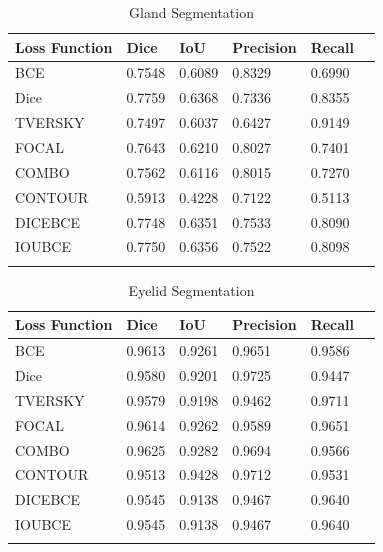 \documentclass{article}
\begin{document}




\begin{table}[h]
\centering
\caption{Gland Segmentation}
\begin{tabular}{llllll}
   Loss Function & Dice  & IoU & Precision & Recall \\
   \hline
   BCE & 0.7548& 0.6089& 0.8329& 0.6990\\
   Dice & 0.7759& 0.6368& 0.7336& 0.8355\\
   TVERSKY & 0.7497& 0.6037& 0.6427& 0.9149\\
   FOCAL & 0.7643& 0.6210& 0.8027& 0.7401\\
   COMBO&0.7562&0.6116&0.8015&0.7270\\
   CONTOUR&0.5913&0.4228&0.7122&0.5113\\
   DICEBCE&0.7748&0.6351&0.7533&0.8090\\
   IOUBCE&0.7750&0.6356&0.7522&0.8098\\
\label{tab:gland-eval-metrics}
\end{tabular}
\end{table}


\begin{table}[h]
\centering
\caption{Eyelid Segmentation}
\begin{tabular}{llllll}
   Loss Function & Dice  & IoU & Precision & Recall \\
   \hline
   BCE & 0.9613& 0.9261& 0.9651& 0.9586\\
   Dice & 0.9580& 0.9201& 0.9725& 0.9447\\
   TVERSKY & 0.9579& 0.9198& 0.9462& 0.9711\\
   FOCAL & 0.9614& 0.9262& 0.9589& 0.9651\\
   COMBO&0.9625&0.9282&0.9694&0.9566\\
   CONTOUR&0.9513&0.9428&0.9712&0.9531\\
   DICEBCE&0.9545&0.9138&0.9467&0.9640\\
   IOUBCE&0.9545&0.9138&0.9467&0.9640\\
\label{tab:eyelid-eval-metrics}
\end{tabular}
\end{table}
\end{document}
